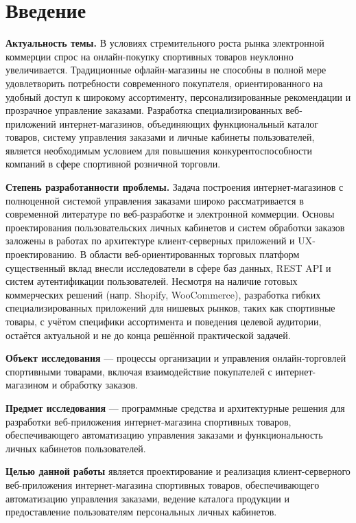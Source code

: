 \section*{Введение}

\textbf{Актуальность темы.} В условиях стремительного роста рынка электронной коммерции 
спрос на онлайн-покупку спортивных товаров неуклонно увеличивается. Традиционные 
офлайн-магазины не способны в полной мере удовлетворить потребности современного 
покупателя, ориентированного на удобный доступ к широкому ассортименту, 
персонализированные рекомендации и прозрачное управление заказами. Разработка 
специализированных веб-приложений интернет-магазинов, объединяющих функциональный 
каталог товаров, систему управления заказами и личные кабинеты пользователей, является 
необходимым условием для повышения конкурентоспособности компаний в сфере спортивной
розничной торговли.

\textbf{Степень разработанности проблемы.} Задача построения интернет-магазинов с 
полноценной системой управления заказами широко рассматривается в современной литературе 
по веб-разработке и электронной коммерции. Основы проектирования пользовательских личных 
кабинетов и систем обработки заказов заложены в работах по архитектуре клиент-серверных 
приложений и UX-проектированию. В области веб-ориентированных торговых платформ существенный 
вклад внесли исследователи в сфере баз данных, REST API и систем аутентификации пользователей. 
Несмотря на наличие готовых коммерческих решений (напр. Shopify, WooCommerce), разработка 
гибких специализированных приложений для нишевых рынков, таких как спортивные товары, с 
учётом специфики ассортимента и поведения целевой аудитории, остаётся актуальной и не 
до конца решённой практической задачей.

\textbf{Объект исследования} — процессы организации и управления онлайн-торговлей 
спортивными товарами, включая взаимодействие покупателей с интернет-магазином 
и обработку заказов.

\textbf{Предмет исследования} — программные средства и архитектурные решения для разработки 
веб-приложения интернет-магазина спортивных товаров, обеспечивающего автоматизацию управления 
заказами и функциональность личных кабинетов пользователей.

\textbf{Целью данной работы} является проектирование и реализация клиент-серверного веб-приложения
интернет-магазина спортивных товаров, обеспечивающего автоматизацию управления заказами, 
ведение каталога продукции и предоставление пользователям персональных личных кабинетов.
